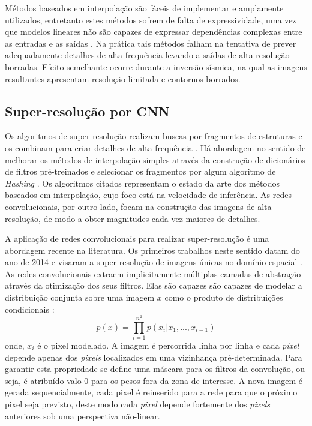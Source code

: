 Métodos baseados em interpolação são fáceis de implementar e amplamente utilizados,
entretanto estes métodos sofrem de falta de expressividade, uma vez que modelos lineares
não são capazes de expressar dependências complexas entre as entradas e as saídas \citep{HsiehAndrews1978}.
Na prática tais métodos falham na tentativa de prever adequadamente detalhes de alta frequência
levando a saídas de alta resolução borradas. Efeito semelhante ocorre durante a inversão sísmica,
na qual as imagens resultantes apresentam resolução limitada e contornos borrados.

\subsection{Super-resolução por CNN}

Os algoritmos de super-resolução realizam buscas por
fragmentos de estruturas e os combinam para criar detalhes
de alta frequência \citep{Freeman2002,Huang2015}. Há abordagem no sentido
de melhorar os métodos de interpolação simples através da construção
de dicionários de filtros pré-treinados e selecionar os fragmentos
por algum algoritmo de \textit{Hashing} \citep{Romano2017}. Os algoritmos citados
representam o estado da arte dos métodos baseados em interpolação, cujo foco está na
velocidade de inferência. As redes convolucionais, por outro lado,
focam na construção das imagens de alta resolução, de modo a obter magnitudes
cada vez maiores de detalhes.

A aplicação de redes convolucionais para realizar super-resolução é uma abordagem
recente na literatura. Os primeiros trabalhos neste sentido datam
do ano de 2014 e visaram a super-resolução de imagens únicas no
domínio espacial \cite{dong16}. As redes convolucionais extraem implicitamente
múltiplas camadas de abstração através da otimização dos seus filtros.
Elas são capazes são capazes de modelar a distribuição conjunta sobre
uma imagem $x$ como o produto de distribuições condicionais \citep{Oord16}:
\begin{equation}
\label{eqn:prodcnn}
p(x) = \prod_{i=1}^{n^2}p(x_i|x_1,...,x_{i-1})
\end{equation}
onde, $x_i$ é o pixel modelado. A imagem é percorrida linha por linha e cada
\textit{pixel} depende apenas dos \textit{pixels} localizados em uma vizinhança pré-determinada.
Para garantir esta propriedade se define uma máscara para os filtros da convolução,
ou seja, é atribuído valo $0$ para os pesos fora da zona de interesse.
A nova imagem é gerada sequencialmente, cada pixel é reinserido para a rede para que o próximo pixel seja previsto,
deste modo cada \textit{pixel} depende fortemente dos \textit{pixels} anteriores
sob uma perspectiva não-linear.

